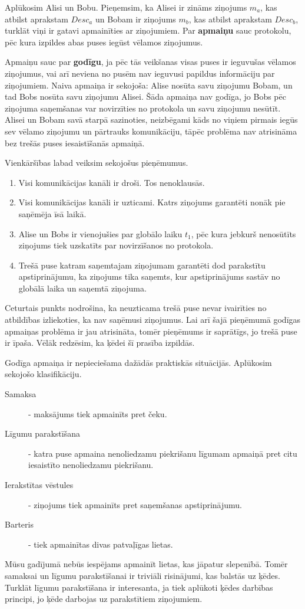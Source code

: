 Aplūkosim Alisi un Bobu. Pieņemsim, ka Alisei ir zināms ziņojums $m_a$, kas atbilst aprakstam $Desc_a$ un Bobam ir ziņojums $m_b$, kas atbilst aprakstam $Desc_b$, turklāt viņi ir gatavi apmainīties ar ziņojumiem.
 Par \textbf{apmaiņu} sauc protokolu, pēc kura izpildes abas puses iegūst vēlamos ziņojumus. 

Apmaiņu sauc par \textbf{godīgu}, ja pēc tās veikšanas visas puses ir ieguvušas vēlamos ziņojumus, vai arī neviena no pusēm nav ieguvusi papildus informāciju par ziņojumiem. Naiva apmaiņa ir sekojoša: Alise nosūta savu ziņojumu Bobam, un tad Bobs nosūta savu ziņojumu Alisei. Šāda apmaiņa nav godīga, jo Bobs pēc ziņojuma saņemšanas var novirzīties no protokola un savu ziņojumu nesūtīt. Alisei un Bobam savā starpā sazinoties, neizbēgami kāds no viņiem pirmais iegūs sev vēlamo ziņojumu un pārtrauks komunikāciju, tāpēc problēma nav atrisināma bez trešās puses iesaistīšanās apmaiņā.\cite{pagnia99}

Vienkāršības labad veiksim sekojošus pieņēmumus.
\begin{enumerate}
    \item Visi komunikācijas kanāli ir droši. Tos nenoklausās.
    \item Visi komunikācijas kanāli ir uzticami. Katrs ziņojums garantēti nonāk pie saņēmēja īsā laikā.
    \item Alise un Bobs ir vienojušies par globālo laiku $t_1$, pēc kura jebkurš nenosūtīts ziņojums tiek uzskatīts par novirzīšanos no protokola.
    \item Trešā puse katram saņemtajam ziņojumam garantēti dod parakstītu apstiprinājumu, ka ziņojums tika saņemts, kur apstiprinājums sastāv no globālā laika un saņemtā ziņojuma.
\end{enumerate}
Ceturtais punkts nodrošina, ka neuzticama trešā puse nevar ivairīties no atbildības izliekoties, ka nav saņēmusi ziņojumus. Lai arī šajā pieņēmumā godīgas apmaiņas problēma ir jau atrisināta, tomēr pieņēmums ir saprātīgs, jo trešā puse ir īpaša. Vēlāk redzēsim, ka ķēdei šī prasība izpildās.

Godīga apmaiņa ir nepieciešama dažādās praktiskās situācijās. Aplūkosim sekojošo klasifikāciju.\cite[p.~8]{asokan98}
\begin{description}
    \item[Samaksa] - maksājums tiek apmainīts pret čeku.
    \item[Līgumu parakstīšana] - katra puse apmaina nenoliedzamu piekrišanu līgumam apmaiņā pret citu iesaistīto nenoliedzamu piekrišanu.
    \item[Ierakstītas vēstules] - ziņojums tiek apmainīts pret saņemšanas apstiprinājumu.
    \item[Barteris] - tiek apmainītas divas patvaļīgas lietas.
\end{description}
Mūsu gadījumā nebūs iespējams apmainīt lietas, kas jāpatur slepenībā. Tomēr samaksai un līgumu parakstīšanai ir triviāli risinājumi, kas balstās uz ķēdes. Turklāt līgumu parakstīšana ir interesanta, ja tiek aplūkoti ķēdes darbības principi, jo ķēde darbojas uz parakstītiem ziņojumiem.

